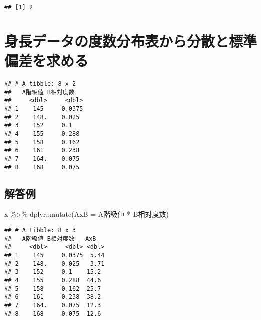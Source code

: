 \documentclass[
  12pt,
]{book}
\newenvironment{Shaded}{\begin{snugshade}}{\end{snugshade}}
\newcommand{\AttributeTok}[1]{\textcolor[rgb]{0.77,0.63,0.00}{#1}}
\newcommand{\FunctionTok}[1]{\textcolor[rgb]{0.00,0.00,0.00}{#1}}
\newcommand{\NormalTok}[1]{#1}
\newcommand{\OtherTok}[1]{\textcolor[rgb]{0.56,0.35,0.01}{#1}}
\newcommand{\SpecialCharTok}[1]{\textcolor[rgb]{0.00,0.00,0.00}{#1}}
\newcommand{\StringTok}[1]{\textcolor[rgb]{0.31,0.60,0.02}{#1}}
\begin{document}
\begin{verbatim}
## [1] 2
\end{verbatim}

\hypertarget{ux8eabux9577ux30c7ux30fcux30bfux306eux5ea6ux6570ux5206ux5e03ux8868ux304bux3089ux5206ux6563ux3068ux6a19ux6e96ux504fux5deeux3092ux6c42ux3081ux308b}{%
\section*{身長データの度数分布表から分散と標準偏差を求める}\label{ux8eabux9577ux30c7ux30fcux30bfux306eux5ea6ux6570ux5206ux5e03ux8868ux304bux3089ux5206ux6563ux3068ux6a19ux6e96ux504fux5deeux3092ux6c42ux3081ux308b}}

\begin{verbatim}
## # A tibble: 8 x 2
##   A階級値 B相対度数
##     <dbl>     <dbl>
## 1    145     0.0375
## 2    148.    0.025 
## 3    152     0.1   
## 4    155     0.288 
## 5    158     0.162 
## 6    161     0.238 
## 7    164.    0.075 
## 8    168     0.075
\end{verbatim}

\hypertarget{ux89e3ux7b54ux4f8b-3}{%
\subsection*{解答例}\label{ux89e3ux7b54ux4f8b-3}}

\begin{Shaded}
\begin{Highlighting}[]
\NormalTok{x }\SpecialCharTok{\%\textgreater{}\%} 
\NormalTok{  dplyr}\SpecialCharTok{::}\FunctionTok{mutate}\NormalTok{(}\StringTok{\textasciigrave{}}\AttributeTok{AxB}\StringTok{\textasciigrave{}} \OtherTok{=} \StringTok{\textasciigrave{}}\AttributeTok{A階級値}\StringTok{\textasciigrave{}} \SpecialCharTok{*} \StringTok{\textasciigrave{}}\AttributeTok{B相対度数}\StringTok{\textasciigrave{}}\NormalTok{)}
\end{Highlighting}
\end{Shaded}

\begin{verbatim}
## # A tibble: 8 x 3
##   A階級値 B相対度数   AxB
##     <dbl>     <dbl> <dbl>
## 1    145     0.0375  5.44
## 2    148.    0.025   3.71
## 3    152     0.1    15.2 
## 4    155     0.288  44.6 
## 5    158     0.162  25.7 
## 6    161     0.238  38.2 
## 7    164.    0.075  12.3 
## 8    168     0.075  12.6
\end{verbatim}
\end{document}
